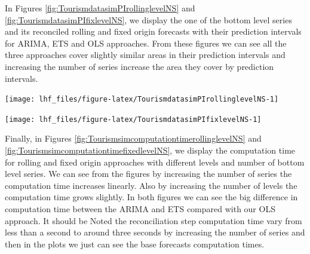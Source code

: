 \documentclass[11pt,a4paper,]{article}
\let\origfigure\figure
\let\endorigfigure\endfigure
\renewenvironment{figure}[1][2] {
    \expandafter\origfigure\expandafter[!htbp]
} {
    \endorigfigure
}
\begin{document}
In Figures \ref{fig:TourismdatasimPIrollinglevelNS} and \ref{fig:TourismdatasimPIfixlevelNS}, we display the one of the bottom level series and its reconciled rolling and fixed origin forecasts with their prediction intervals for ARIMA, ETS and OLS approaches. From these figures we can see all the three approaches cover slightly similar areas in their prediction intervals and increasing the number of series increase the area they cover by prediction intervals.

\begin{figure}

{\centering \texttt{[image: lhf\_files/figure-latex/TourismdatasimPIrollinglevelNS-1]} 

}

\caption{The actual test set for one of the bottom level series with different number of series and hierarchy levels forecasted with ETS, ARIMA and OLS with reconciliation and prediction intervals - Rolling origin - two years forecast points with 0.5 error value.}\label{fig:TourismdatasimPIrollinglevelNS}
\end{figure}

\begin{figure}

{\centering \texttt{[image: lhf\_files/figure-latex/TourismdatasimPIfixlevelNS-1]} 

}

\caption{The actual test set for one of the bottom level series with different number of series and hierarchy levels forecasted with ETS, ARIMA and OLS with reconciliation and prediction intervals - Fixed origin - two years forecast points with 0.5 error value.}\label{fig:TourismdatasimPIfixlevelNS}
\end{figure}

Finally, in Figures \ref{fig:TourismsimcomputationtimerollinglevelNS} and \ref{fig:TourismsimcomputationtimefixedlevelNS}, we display the computation time for rolling and fixed origin approaches with different levels and number of bottom level series. We can see from the figures by increasing the number of series the computation time increases linearly. Also by increasing the number of levels the computation time grows slightly. In both figures we can see the big difference in computation time between the ARIMA and ETS compared with our OLS approach. It should be Noted the reconciliation step computation time vary from less than a second to around three seconds by increasing the number of series and then in the plots we just can see the base forecasts computation times.
\end{document}
